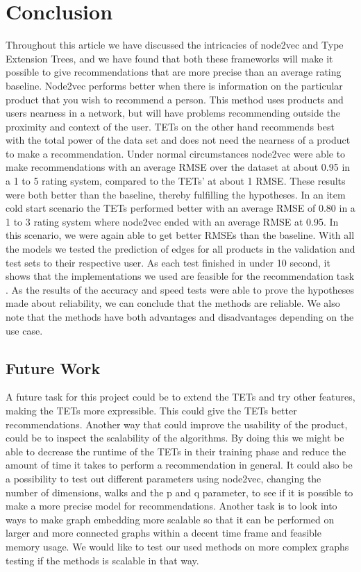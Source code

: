 \section{Conclusion}
Throughout this article we have discussed the intricacies of node2vec and Type Extension Trees, and we have found that both these frameworks will make it possible to give recommendations that are more precise than an average rating baseline.
Node2vec performs better when there is information on the particular product that you wish to recommend a person.
This method uses products and users nearness in a network, but will have problems recommending outside the proximity and context of the user.
TETs on the other hand recommends best with the total power of the data set and does not need the nearness of a product to make a recommendation.
Under normal circumstances node2vec were able to make recommendations with an average RMSE over the dataset at about 0.95 in a 1 to 5 rating system, compared to the TETs' at about 1 RMSE.
These results were both better than the baseline, thereby fulfilling the hypotheses.
In an item cold start scenario the TETs performed better with an average RMSE of 0.80 in a 1 to 3 rating system where node2vec ended with an average RMSE at 0.95.
In this scenario, we were again able to get better RMSEs than the baseline.
With all the models we tested  the prediction of edges for all products in the validation and test sets to their respective user.
As each test finished in under 10 second, it shows that the implementations we used are feasible for the recommendation task .
As the results of the accuracy and speed tests were able to prove the hypotheses made about reliability, we can conclude that the methods are reliable.
We also note that the methods have both advantages and disadvantages depending on the use case. 

\subsection{Future Work}
A future task for this project could be to extend the TETs and try other features, making the TETs more expressible. This could give the TETs better recommendations.
Another way that could improve the usability of the product, could be to inspect the scalability of the algorithms.
By doing this we might be able to decrease the runtime of the TETs in their training phase and reduce the amount of time it takes to perform a recommendation in general.
It could also be a possibility to test out different parameters using node2vec, changing the number of dimensions, walks and the p and q parameter, to see if it is possible to make a more precise model for recommendations.
Another task is to look into ways to make graph embedding more scalable so that it can be performed on larger and more connected graphs within a decent time frame and feasible memory usage. 
We would like to test our used methods on more complex graphs testing if the methods is scalable in that way.
